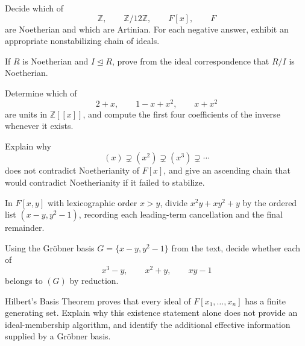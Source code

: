 \begin{exercise}[Basic] Decide which of
\[
\mathbb Z,\qquad \mathbb Z/12\mathbb Z,\qquad F[x],\qquad F
\]
are Noetherian and which are Artinian.  For each negative answer, exhibit an
appropriate nonstabilizing chain of ideals.\end{exercise}
\begin{exercise}[Core] If \(R\) is Noetherian and \(I\trianglelefteq R\),
prove from the ideal correspondence that \(R/I\) is Noetherian.\end{exercise}
\begin{exercise}[Core] Determine which of
\[
2+x,\qquad 1-x+x^2,\qquad x+x^2
\]
are units in \(\mathbb Z[[x]]\), and compute the first four coefficients of
the inverse whenever it exists.\end{exercise}
\begin{exercise}[Core] Explain why
\[
(x)\supsetneq(x^2)\supsetneq(x^3)\supsetneq\cdots
\]
does not contradict Noetherianity of \(F[x]\), and give an ascending chain
that would contradict Noetherianity if it failed to stabilize.\end{exercise}
\begin{exercise}[Further] In \(F[x,y]\) with lexicographic order \(x>y\),
divide \(x^2y+xy^2+y\) by the ordered list
\((x-y,y^2-1)\), recording each leading-term cancellation and the final
remainder.\end{exercise}
\begin{exercise}[Further] Using the Gr\"obner basis
\(G=\{x-y,y^2-1\}\) from the text, decide whether each of
\[
x^3-y,\qquad x^2+y,\qquad xy-1
\]
belongs to \((G)\) by reduction.\end{exercise}
\begin{exercise} Hilbert's Basis Theorem proves that every
ideal of \(F[x_1,\ldots,x_n]\) has a finite generating set.  Explain why
this existence statement alone does not provide an ideal-membership
algorithm, and identify the additional effective information supplied by a
Gr\"obner basis.\end{exercise}

